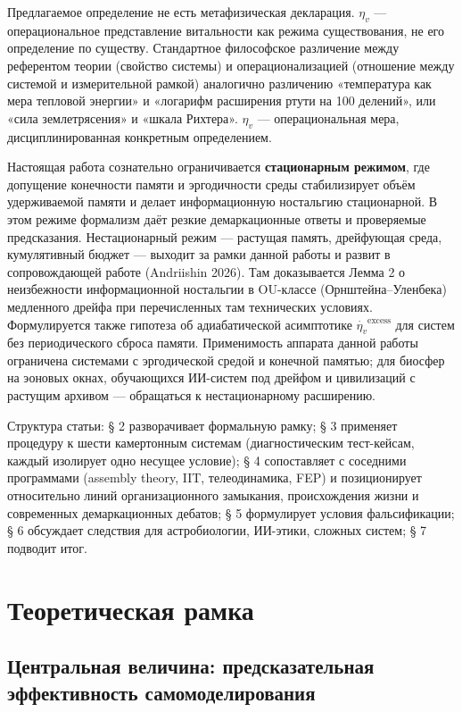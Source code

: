 \documentclass[pdflatex,sn-mathphys-ay]{sn-jnl}
\begin{document}
Предлагаемое определение не есть метафизическая декларация. \(\eta_v\) --- операциональное представление витальности как режима существования, не его определение по существу. Стандартное философское различение между референтом теории (свойство системы) и операционализацией (отношение между системой и измерительной рамкой) аналогично различению «температура как мера тепловой энергии» и «логарифм расширения ртути на 100 делений», или «сила землетрясения» и «шкала Рихтера». \(\eta_v\) --- операциональная мера, дисциплинированная конкретным определением.

Настоящая работа сознательно ограничивается \textbf{стационарным режимом}, где допущение конечности памяти и эргодичности среды стабилизирует объём удерживаемой памяти и делает информационную ностальгию стационарной. В этом режиме формализм даёт резкие демаркационные ответы и проверяемые предсказания. Нестационарный режим --- растущая память, дрейфующая среда, кумулятивный бюджет --- выходит за рамки данной работы и развит в сопровождающей работе (Andriishin 2026). Там доказывается Лемма 2 о неизбежности информационной ностальгии в OU-классе (Орнштейна--Уленбека) медленного дрейфа при перечисленных там технических условиях. Формулируется также гипотеза об адиабатической асимптотике \(\dot{\eta_v}^{\text{excess}}\) для систем без периодического сброса памяти. Применимость аппарата данной работы ограничена системами с эргодической средой и конечной памятью; для биосфер на эоновых окнах, обучающихся ИИ-систем под дрейфом и цивилизаций с растущим архивом --- обращаться к нестационарному расширению.

Структура статьи: § 2 разворачивает формальную рамку; § 3 применяет процедуру к шести камертонным системам (диагностическим тест-кейсам, каждый изолирует одно несущее условие); § 4 сопоставляет с соседними программами (assembly theory, IIT, телеодинамика, FEP) и позиционирует относительно линий организационного замыкания, происхождения жизни и современных демаркационных дебатов; § 5 формулирует условия фальсификации; § 6 обсуждает следствия для астробиологии, ИИ-этики, сложных систем; § 7 подводит итог.

\section{Теоретическая рамка}\label{ux442ux435ux43eux440ux435ux442ux438ux447ux435ux441ux43aux430ux44f-ux440ux430ux43cux43aux430}

\subsection{Центральная величина: предсказательная эффективность самомоделирования}\label{ux446ux435ux43dux442ux440ux430ux43bux44cux43dux430ux44f-ux432ux435ux43bux438ux447ux438ux43dux430-ux43fux440ux435ux434ux441ux43aux430ux437ux430ux442ux435ux43bux44cux43dux430ux44f-ux44dux444ux444ux435ux43aux442ux438ux432ux43dux43eux441ux442ux44c-ux441ux430ux43cux43eux43cux43eux434ux435ux43bux438ux440ux43eux432ux430ux43dux438ux44f}
\end{document}

